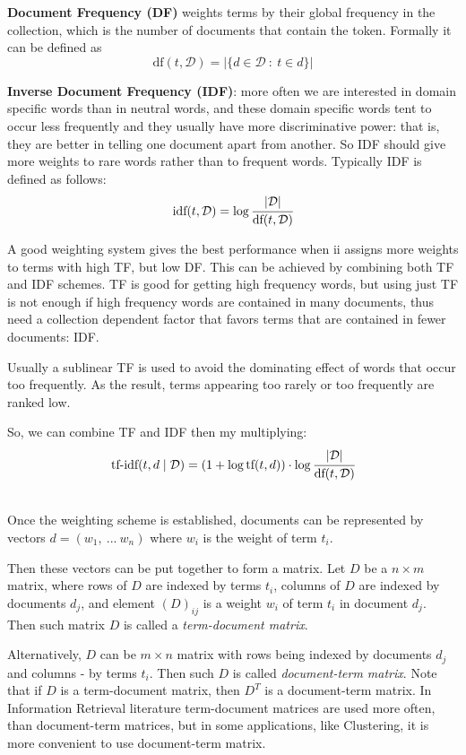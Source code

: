 \textbf{Document Frequency (DF)} weights terms by their global frequency
in the collection, which is the number of documents that contain the token.
Formally it can be defined as
$$\text{df}(t, \mathcal D) = \big| \{ d \in \mathcal D \ : \  t \in d \} \big|$$


\textbf{Inverse Document Frequency (IDF)}: more often we are interested
in domain specific words than in neutral words, and these domain specific
words tent to occur less frequently and they usually have more discriminative
power: that is, they are better in telling one document apart from another.
So IDF should give more weights to rare words rather than to frequent words.
Typically IDF is defined as follows:
$$\text{idf}(t, \mathcal D) = \log \cfrac{ |\mathcal D| }{\text{df}(t, \mathcal D)}$$


A good weighting system gives the best performance when
ii assigns more weights to terms with high TF, but low DF.
\cite{salton1988term} This can be achieved by combining both TF and IDF
schemes. TF is good for getting high frequency words, but using
just TF is not enough if high frequency words are contained in
many documents, thus need a collection dependent factor that favors
terms that are contained in fewer documents: IDF.

Usually a sublinear TF is used to avoid the dominating effect of
words that occur too frequently. As the result, terms appearing
too rarely or too frequently are ranked low.

So, we can combine TF and IDF then my multiplying:
$$\text{tf-idf}(t, d \mid \mathcal D) = (1 + \log \text{tf}(t, d)) \cdot \log \cfrac{|\mathcal D|}{\text{df}(t, \mathcal D)}$$


\ \\

Once the weighting scheme is established, documents can be represented
by vectors $d = (w_1, \ ... \ w_n)$ where $w_i$ is the weight of term
$t_i$.

Then these vectors can be put together to form a matrix. Let $D$ be
a $n \times m$ matrix, where rows of $D$ are indexed by terms $t_i$,
columns of $D$ are indexed by documents $d_j$, and element $(D)_{ij}$
is a weight $w_i$ of term $t_i$ in document $d_j$. Then
such matrix $D$ is called a \emph{term-document matrix}.

Alternatively, $D$ can be $m \times n$ matrix with rows being indexed
by documents $d_j$ and columns - by terms $t_i$. Then such $D$ is called
\emph{document-term matrix}. Note that if $D$ is a term-document matrix,
then $D^T$ is a document-term matrix. In Information Retrieval
literature term-document matrices are used more often, than
document-term matrices, but in some applications, like Clustering,
it is more convenient to use document-term matrix.


